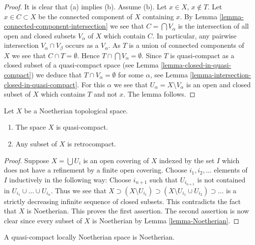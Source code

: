 \begin{proof}
It is clear that (a) implies (b).
Assume (b). Let $x \in X$, $x \not \in T$. Let $x \in C \subset X$
be the connected component of $X$ containing $x$. By
Lemma \ref{lemma-connected-component-intersection}
we see that $C = \bigcap V_\alpha$ is the intersection of all open and
closed subsets $V_\alpha$ of $X$ which contain $C$.
In particular, any pairwise intersection $V_\alpha \cap V_\beta$
occurs as a $V_\alpha$.
As $T$ is a union of connected components
of $X$ we see that $C \cap T = \emptyset$. Hence
$T \cap \bigcap V_\alpha = \emptyset$. Since $T$ is quasi-compact as a
closed subset of a quasi-compact space (see
Lemma \ref{lemma-closed-in-quasi-compact})
we deduce that $T \cap V_\alpha = \emptyset$ for some $\alpha$, see
Lemma \ref{lemma-intersection-closed-in-quasi-compact}.
For this $\alpha$ we see that $U_\alpha = X \setminus V_\alpha$
is an open and closed subset of $X$ which contains $T$ and not $x$.
The lemma follows.
\end{proof}

\begin{lemma}
\label{lemma-Noetherian-quasi-compact}
Let $X$ be a Noetherian topological space.
\begin{enumerate}
\item The space $X$ is quasi-compact.
\item Any subset of $X$ is retrocompact.
\end{enumerate}
\end{lemma}

\begin{proof}
Suppose $X = \bigcup U_i$ is an open covering of $X$ indexed
by the set $I$ which does not have a refinement by a finite
open covering. Choose $i_1, i_2, \ldots $ elements of $I$ inductively
in the following way: Choose $i_{n + 1}$ such that $U_{i_{n + 1}}$
is not contained in $U_{i_1} \cup \ldots \cup U_{i_n}$. Thus we see that
$X \supset (X \setminus U_{i_1}) \supset
(X \setminus U_{i_1} \cup U_{i_2}) \supset \ldots$ is a strictly
decreasing infinite sequence of closed subsets. This contradicts
the fact that $X$ is Noetherian. This proves the first assertion.
The second assertion is now clear since every subset of $X$ is Noetherian by
Lemma \ref{lemma-Noetherian}.
\end{proof}

\begin{lemma}
\label{lemma-quasi-compact-locally-Noetherian-Noetherian}
A quasi-compact locally Noetherian space is Noetherian.
\end{lemma}

